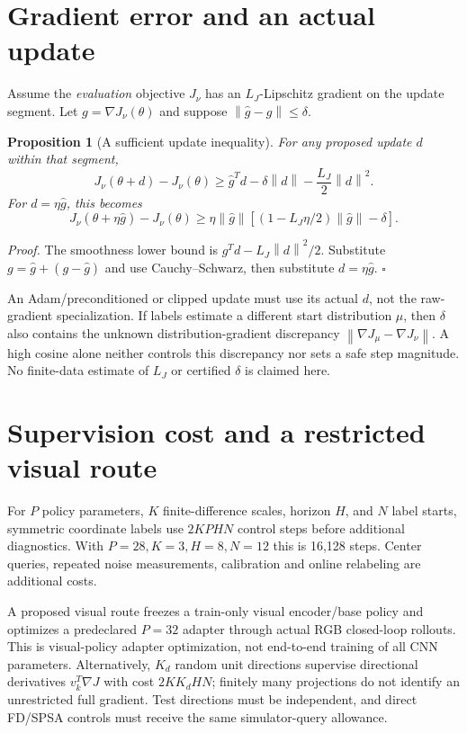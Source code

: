 \documentclass[10pt]{article}
\newtheorem{proposition}{Proposition}
\newenvironment{proof}{\par\noindent\textit{Proof.} }{\hfill$\square$\par}
\newcommand{\norm}[1]{\left\|#1\right\|}
\begin{document}
\section{Gradient error and an actual update}
Assume the \emph{evaluation} objective $J_\nu$ has an $L_J$-Lipschitz gradient on the update segment. Let $g=\nabla J_\nu(\theta)$ and suppose $\norm{\hat g-g}\le\delta$.
\begin{proposition}[A sufficient update inequality]
For any proposed update $d$ within that segment,
\begin{equation}
J_\nu(\theta+d)-J_\nu(\theta)
\ge \hat g^T d-\delta\norm d-\frac{L_J}{2}\norm d^2.
\end{equation}
For $d=\eta\hat g$, this becomes
\begin{equation}
J_\nu(\theta+\eta\hat g)-J_\nu(\theta)
\ge \eta\norm{\hat g}\left[(1-L_J\eta/2)\norm{\hat g}-\delta\right].
\end{equation}
\end{proposition}
\begin{proof}
The smoothness lower bound is $g^Td-L_J\norm d^2/2$. Substitute $g=\hat g+(g-\hat g)$ and use Cauchy--Schwarz, then substitute $d=\eta\hat g$.
\end{proof}
An Adam/preconditioned or clipped update must use its actual $d$, not the raw-gradient specialization. If labels estimate a different start distribution $\mu$, then $\delta$ also contains the unknown distribution-gradient discrepancy $\norm{\nabla J_\mu-\nabla J_\nu}$. A high cosine alone neither controls this discrepancy nor sets a safe step magnitude. No finite-data estimate of $L_J$ or certified $\delta$ is claimed here.

\section{Supervision cost and a restricted visual route}
For $P$ policy parameters, $K$ finite-difference scales, horizon $H$, and $N$ label starts, symmetric coordinate labels use $2KPHN$ control steps before additional diagnostics. With $P=28,K=3,H=8,N=12$ this is 16,128 steps. Center queries, repeated noise measurements, calibration and online relabeling are additional costs.

A proposed visual route freezes a train-only visual encoder/base policy and optimizes a predeclared $P=32$ adapter through actual RGB closed-loop rollouts. This is visual-policy adapter optimization, not end-to-end training of all CNN parameters. Alternatively, $K_d$ random unit directions supervise directional derivatives $v_k^T\nabla J$ with cost $2KK_dHN$; finitely many projections do not identify an unrestricted full gradient. Test directions must be independent, and direct FD/SPSA controls must receive the same simulator-query allowance.
\end{document}
